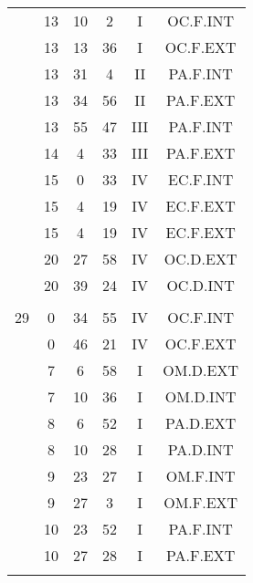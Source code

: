\documentclass[12pt, a4paper]{article}
\begin{document}
\begin{multicols}{3}
{\begin{tabular}{c c c c c c}
	 	 	 	 & 13 & 10 & 2 & I & OC.F.INT\\%
	 	 	 	 & 13 & 13 & 36 & I & OC.F.EXT\\%
	 	 	 	 & 13 & 31 & 4 & II & PA.F.INT\\%
	 	 	 	 & 13 & 34 & 56 & II & PA.F.EXT\\%
	 	 	 	 & 13 & 55 & 47 & III & PA.F.INT\\%
	 	 	 	 & 14 & 4 & 33 & III & PA.F.EXT\\%
	 	 	 	 & 15 & 0 & 33 & IV & EC.F.INT\\%
	 	 	 	 & 15 & 4 & 19 & IV & EC.F.EXT\\%
	 	 	 	 & 15 & 4 & 19 & IV & EC.F.EXT\\%
	 	 	 	 & 20 & 27 & 58 & IV & OC.D.EXT\\%
	 	 	 	 & 20 & 39 & 24 & IV & OC.D.INT\\%
	 	 	 	 & & & & & \\%
	 	 	 	29 & 0 & 34 & 55 & IV & OC.F.INT\\%
	 	 	 	 & 0 & 46 & 21 & IV & OC.F.EXT\\%
	 	 	 	 & 7 & 6 & 58 & I & OM.D.EXT\\%
	 	 	 	 & 7 & 10 & 36 & I & OM.D.INT\\%
	 	 	 	 & 8 & 6 & 52 & I & PA.D.EXT\\%
	 	 	 	 & 8 & 10 & 28 & I & PA.D.INT\\%
	 	 	 	 & 9 & 23 & 27 & I & OM.F.INT\\%
	 	 	 	 & 9 & 27 & 3 & I & OM.F.EXT\\%
	 	 	 	 & 10 & 23 & 52 & I & PA.F.INT\\%
	 	 	 	 & 10 & 27 & 28 & I & PA.F.EXT\\%
	 	 	 	 & & & & & \\%

\end{tabular}}
\end{multicols}
\end{document}
